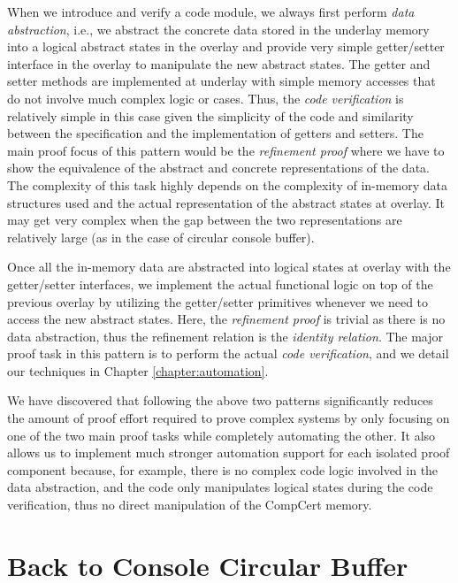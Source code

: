 When we introduce and verify a code module, we always first perform {\it data abstraction},
i.e., we abstract the concrete data stored in the underlay memory into a logical
abstract states in the overlay and provide very simple getter/setter interface in
the overlay to manipulate the new abstract states. The getter and setter methods
are implemented at underlay with simple memory accesses that do not involve much
complex logic or cases. Thus, the {\it code verification} is relatively simple in this case
given the simplicity of the code and similarity between the specification and the
implementation of getters and setters. The main proof focus of this pattern would
be the {\it refinement proof} where we have to show the equivalence of the abstract
and concrete representations of the data. The complexity of this task highly depends
on the complexity of in-memory data structures used and the actual representation
of the abstract states at overlay. It may get very complex when the gap between 
the two representations are relatively large (as in the case of circular console buffer).

Once all the in-memory data are abstracted into logical states at overlay with
the getter/setter interfaces, we implement the actual functional logic on top
of the previous overlay by utilizing the getter/setter primitives whenever
we need to access the new abstract states. Here, the {\it refinement proof}
is trivial as there is no data abstraction, thus the refinement relation is
the {\it identity relation}. The major proof task in this pattern is to perform
the actual {\it code verification}, and we detail our techniques in Chapter
\ref{chapter:automation}.

We have discovered that following the above two patterns significantly reduces the
amount of proof effort required to prove complex systems by only focusing on one
of the two main proof tasks while completely automating the other.
It also allows us to implement much stronger automation support for each isolated
proof component because, for example, there is no complex code logic involved in the
data abstraction, and the code only manipulates logical states during the
code verification, thus no direct manipulation of the CompCert memory.


\section{Back to Console Circular Buffer}
\label{chapter:framework:console-buffer}


